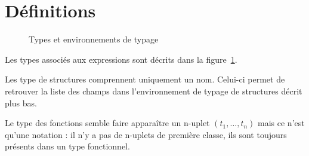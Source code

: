 \section{Définitions}

\begin{figure}




  \caption{Types et environnements de typage}

  \label{fig:les-types}

\end{figure}

Les types associés aux expressions sont décrits dans la
figure~\ref{fig:les-types}.

Les type de structures comprennent uniquement un nom. Celui-ci permet de
retrouver la liste des champs dans l'environnement de typage de structures
décrit plus bas.

Le type des fonctions semble faire apparaître un n-uplet $(t_1, …, t_n)$ mais ce
n'est qu'une notation : il n'y a pas de n-uplets de première classe, ils sont
toujours présents dans un type fonctionnel.

